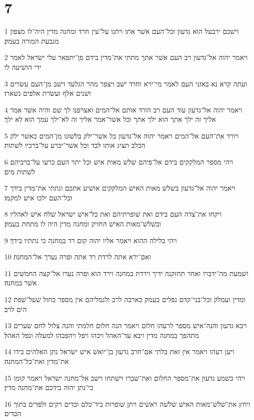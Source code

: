 \chapter{7}

\par 1 וישׁכם ירבעל הוא גדעון וכל־העם אשׁר אתו ויחנו על־עין חרד ומחנה מדין היה־לו מצפון מגבעת המורה בעמק׃
\par 2 ויאמר יהוה אל־גדעון רב העם אשׁר אתך מתתי את־מדין בידם פן־יתפאר עלי ישׂראל לאמר ידי הושׁיעה לי׃
\par 3 ועתה קרא נא באזני העם לאמר מי־ירא וחרד ישׁב ויצפר מהר הגלעד וישׁב מן־העם עשׂרים ושׁנים אלף ועשׂרת אלפים נשׁארו׃
\par 4 ויאמר יהוה אל־גדעון עוד העם רב הורד אותם אל־המים ואצרפנו לך שׁם והיה אשׁר אמר אליך זה ילך אתך הוא ילך אתך וכל אשׁר־אמר אליך זה לא־ילך עמך הוא לא ילך׃
\par 5 ויורד את־העם אל־המים ויאמר יהוה אל־גדעון כל אשׁר־ילק בלשׁונו מן־המים כאשׁר ילק הכלב תציג אותו לבד וכל אשׁר־יכרע על־ברכיו לשׁתות׃
\par 6 ויהי מספר המלקקים בידם אל־פיהם שׁלשׁ מאות אישׁ וכל יתר העם כרעו על־ברכיהם לשׁתות מים׃
\par 7 ויאמר יהוה אל־גדעון בשׁלשׁ מאות האישׁ המלקקים אושׁיע אתכם ונתתי את־מדין בידך וכל־העם ילכו אישׁ למקמו׃
\par 8 ויקחו את־צדה העם בידם ואת שׁופרתיהם ואת כל־אישׁ ישׂראל שׁלח אישׁ לאהליו ובשׁלשׁ־מאות האישׁ החזיק ומחנה מדין היה לו מתחת בעמק׃
\par 9 ויהי בלילה ההוא ויאמר אליו יהוה קום רד במחנה כי נתתיו בידך׃
\par 10 ואם־ירא אתה לרדת רד אתה ופרה נערך אל־המחנה׃
\par 11 ושׁמעת מה־ידברו ואחר תחזקנה ידיך וירדת במחנה וירד הוא ופרה נערו אל־קצה החמשׁים אשׁר במחנה׃
\par 12 ומדין ועמלק וכל־בני־קדם נפלים בעמק כארבה לרב ולגמליהם אין מספר כחול שׁעל־שׂפת הים לרב׃
\par 13 ויבא גדעון והנה־אישׁ מספר לרעהו חלום ויאמר הנה חלום חלמתי והנה צלול לחם שׂערים מתהפך במחנה מדין ויבא עד־האהל ויכהו ויפל ויהפכהו למעלה ונפל האהל׃
\par 14 ויען רעהו ויאמר אין זאת בלתי אם־חרב גדעון בן־יואשׁ אישׁ ישׂראל נתן האלהים בידו את־מדין ואת־כל־המחנה׃
\par 15 ויהי כשׁמע גדעון את־מספר החלום ואת־שׁברו וישׁתחו וישׁב אל־מחנה ישׂראל ויאמר קומו כי־נתן יהוה בידכם את־מחנה מדין׃
\par 16 ויחץ את־שׁלשׁ־מאות האישׁ שׁלשׁה ראשׁים ויתן שׁופרות ביד־כלם וכדים רקים ולפדים בתוך הכדים׃
